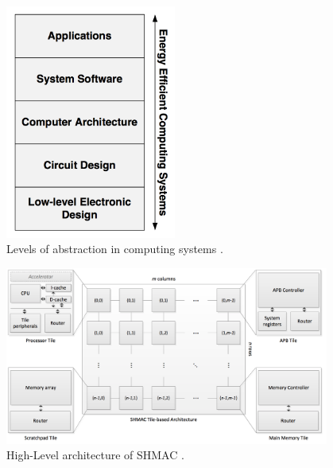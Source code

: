 \begin{figure}[htb]
    \centering
    \includegraphics[width=0.5\textwidth]{Figures/Heterogeneous/SHMACAbstractionLevels}
    \caption{Levels of abstraction in computing systems \cite{shmac-plan}.}
    \label{fig:shmacAbstractionLevels}
\end{figure}

\begin{figure}[htb]
    \centering
    \includegraphics[width=0.95\textwidth]{Figures/Heterogeneous/SHMAC}
    \caption{High-Level architecture of SHMAC \cite{shmac-plan}.}
    \label{fig:shmac}
\end{figure}


